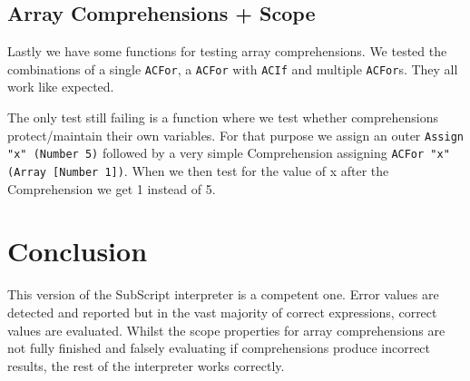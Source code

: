 \documentclass{article}
\begin{document}
\subsection{Array Comprehensions + Scope}
Lastly we have some functions for testing array comprehensions.
We tested the combinations of a single \texttt{ACFor}, a \texttt{ACFor} with \texttt{ACIf} and multiple \texttt{ACFor}s.
They all work like expected.

The only test still failing is a function where we test whether comprehensions protect/maintain their own variables.
For that purpose we assign an outer \texttt{Assign "x" (Number 5)} followed by a very simple Comprehension assigning \texttt{ACFor "x" (Array [Number 1])}.
When we then test for the value of x after the Comprehension we get 1 instead of 5.

\section{Conclusion}
This version of the SubScript interpreter is a competent one. Error values are detected and reported but in the vast majority of correct expressions, correct values are evaluated. Whilst the scope properties for array comprehensions are not fully finished and falsely evaluating if comprehensions produce incorrect results, the rest of the interpreter works correctly.
\end{document}
